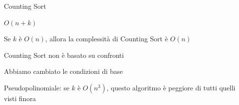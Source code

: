 \begin{frame}{Counting Sort}
	
\vspace{-9pt}
\begin{myboxtitle}
\BI
\item $O(n+k)$
\item Se $k$ è $O(n)$, allora la complessità di Counting Sort è $O(n)$
\EI
\end{myboxtitle}

\begin{myboxtitle}
\BI
\item Counting Sort non è basato su confronti
\item Abbiamo cambiato le condizioni di base 
\item Pseudopolinomiale: se $k$ è $O(n^3)$, questo algoritmo è peggiore di tutti quelli visti finora	
\EI
\end{myboxtitle}
\end{frame}%

